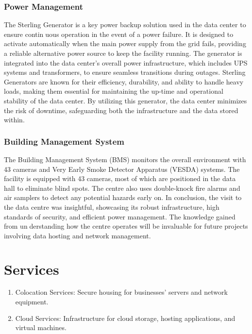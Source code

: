 \documentclass[12pt]{report}
\begin{document}
\begin{flushleft}
\subsection{ Power Management}
\begin{justify}
	 The Sterling Generator is a key power backup solution used in the data center to ensure continuous operation in the event of a power failure. It is designed to activate automatically when the
	 main power supply from the grid fails, providing a reliable alternative power source to keep the
	 facility running. The generator is integrated into the data center’s overall power infrastructure,
	 which includes UPS systems and transformers, to ensure seamless transitions during outages.
	 Sterling Generators are known for their efficiency, durability, and ability to handle heavy loads,
	 making them essential for maintaining the up-time and operational stability of the data center.
	 By utilizing this generator, the data center minimizes the risk of downtime, safeguarding both
	 the infrastructure and the data stored within.
\end{justify}
\subsection{Building Management System}
\begin{justify}
	 The Building Management System (BMS) monitors the overall environment with 43 cameras
	 and Very Early Smoke Detector Apparatus (VESDA) systems. The facility is equipped with 43
	 cameras, most of which are positioned in the data hall to eliminate blind spots. The centre also
	 uses double-knock fire alarms and air samplers to detect any potential hazards early on.
	 In conclusion, the visit to the data centre was insightful, showcasing its robust infrastructure,
	 high standards of security, and efficient power management. The knowledge gained from understanding how the centre operates will be invaluable for future projects involving data hosting
	 and network management.
\end{justify}

\chapter{Services}
\begin{enumerate}
    \item Colocation Services: Secure housing for businesses’ servers and network equipment.

    \item Cloud Services: Infrastructure for cloud storage, hosting applications, and virtual machines.


\end{enumerate}
\end{flushleft}
\end{document}
